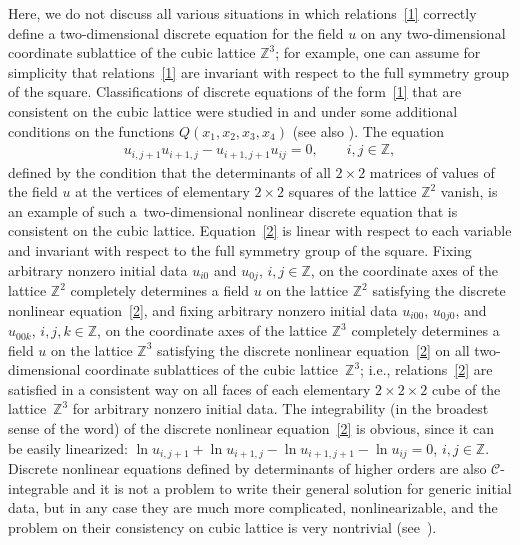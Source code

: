 Here, we do not discuss all various situations in which relations~\eqref{1}
correctly def\/ine a two-dimensional discrete equation for
the f\/ield $u$ on any two-dimensional coordinate sublattice of the
cubic lattice $\mathbb{Z}^3$; for example, one can assume for
simplicity that relations~\eqref{1} are invariant with respect to
the full symmetry group of the square. Classif\/ications of discrete
equations of the form~\eqref{1} that are consistent on the cubic
lattice were studied in \cite{6} and \cite{10} under some additional
conditions on the functions $Q (x_1, x_2, x_3, x_4)$ (see also
\cite{11}). The equation
\begin{gather} u_{i, j + 1} u_{i + 1, j} - u_{i + 1, j + 1}
u_{i j} = 0, \qquad i, j \in \mathbb{Z}, \label{2}
\end{gather}
def\/ined by
the condition that the determinants of all $2\times2$ matrices of
values of the f\/ield $u$ at the vertices of elementary $2\times2$
squares of the lattice $\mathbb Z^2$ vanish, is an example of such a~two-dimensional nonlinear discrete equation that is consistent on
the cubic lattice. Equation~\eqref{2} is linear with respect to each
variable and invariant with respect to the full symmetry group of
the square. Fixing arbitrary nonzero initial data $u_{i 0}$ and
$u_{0 j}$, $i, j \in \mathbb{Z}$, on the coordinate axes of the
lattice $\mathbb{Z}^2$ completely determines a f\/ield $u$ on the
lattice $\mathbb{Z}^2$ satisfying the discrete nonlinear equation~\eqref{2},
and f\/ixing arbitrary nonzero initial data $u_{i  0 0}$,
$u_{ 0 j 0}$, and $u_{0 0 k}$, $i, j, k \in \mathbb{Z}$, on the
coordinate axes of the lattice $\mathbb{Z}^3$ completely determines
a f\/ield $u$ on the lattice $\mathbb{Z}^3$ satisfying the discrete
nonlinear equation~\eqref{2} on all two-dimensional coordinate
sublattices of the cubic lattice~$\mathbb{Z}^3$; i.e., relations~\eqref{2}
are satisf\/ied in a consistent way on all faces of each
elementary $2 \times 2 \times 2$ cube of the lattice~$\mathbb{Z}^3$
for arbitrary nonzero initial data. The integrability (in the
broadest sense of the word) of the discrete nonlinear equation~\eqref{2}
is obvious, since it can be easily linearized: $ \ln u_{i,
j + 1} + \ln u_{i + 1, j} - \ln u_{i + 1, j + 1} - \ln u_{i j} = 0$,
$i, j \in \mathbb{Z}$.
Discrete nonlinear equations def\/ined by determinants of higher
orders are also $\mathcal{C}$-integrable and it is not a problem
to write their general solution for generic initial data, but in any case they are much more complicated, nonlinearizable,
and the problem on their consistency on cubic
lattice is very nontrivial (see~\cite{1, 2}).


